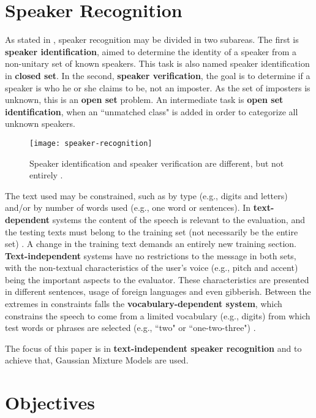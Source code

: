 \section{Speaker Recognition}
\label{sec:speaker-recognition}

As stated in , speaker recognition may be divided in two subareas. The first is \textbf{speaker identification}, aimed to determine the identity of a speaker from a non-unitary set of known speakers. This task is also named speaker identification in \textbf{closed set}. In the second, \textbf{speaker verification}, the goal is to determine if a speaker is who he or she claims to be, not an imposter. As the set of imposters is unknown, this is an \textbf{open set} problem. An intermediate task is \textbf{open set identification}, when an ``unmatched class" is added in order to categorize all unknown speakers.

\begin{figure}[ht]
    \centering
    \texttt{[image: speaker-recognition]}
    \caption{Speaker identification and speaker verification are different, but not entirely .}
    \label{fig:speaker-recognition}
\end{figure}

The text used may be constrained, such as by type (e.g., digits and letters) and/or by number of words used (e.g., one word or sentences). In \textbf{text-dependent} systems the content of the speech is relevant to the evaluation, and the testing texts must belong to the training set (not necessarily be the entire set) . A change in the training text demands an entirely new training section. \textbf{Text-independent} systems have no restrictions to the message in both sets, with the non-textual characteristics of the user's voice (e.g., pitch and accent) being the important aspects to the evaluator. These characteristics are presented in different sentences, usage of foreign languages and even gibberish. Between the extremes in constraints falls the \textbf{vocabulary-dependent system}, which constrains the speech to come from a limited vocabulary (e.g., digits) from which test words or phrases are selected (e.g., ``two" or ``one-two-three") .

The focus of this paper is in \textbf{text-independent speaker recognition} and to achieve that, Gaussian Mixture Models are used.

\section{Objectives}

